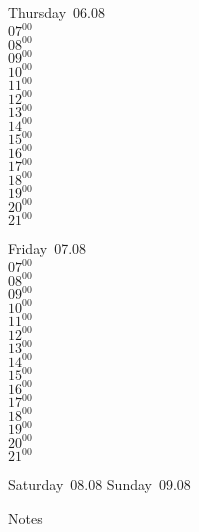 \documentclass[11pt,a4paper]{book}\usepackage[]{graphicx}\usepackage[]{color}
\begin{document}
\clearpage
\begin{headerbox}
\end{headerbox}
\begin{weekdaybox}
  Thursday~06.08\\
  { 
  \vfill
  $07^{00}$\\
$08^{00}$\\
$09^{00}$\\
$10^{00}$\\
$11^{00}$\\
$12^{00}$\\
$13^{00}$\\
$14^{00}$\\
$15^{00}$\\
$16^{00}$\\
$17^{00}$\\
$18^{00}$\\
$19^{00}$\\
$20^{00}$\\
$21^{00}$\\
  }
\end{weekdaybox} 
\begin{weekdaybox}
  Friday~07.08\\
  { 
  \vfill
  $07^{00}$\\
$08^{00}$\\
$09^{00}$\\
$10^{00}$\\
$11^{00}$\\
$12^{00}$\\
$13^{00}$\\
$14^{00}$\\
$15^{00}$\\
$16^{00}$\\
$17^{00}$\\
$18^{00}$\\
$19^{00}$\\
$20^{00}$\\
$21^{00}$\\
  }
\end{weekdaybox}
\begin{weekendbox}
  Saturday~08.08
  \tcblower
  Sunday~09.08
\end{weekendbox} %
\begin{notebox}
  Notes
\end{notebox}
\clearpage
\end{document}
